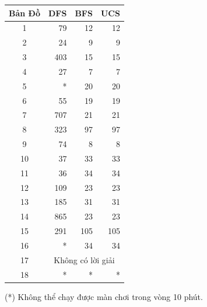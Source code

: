 \documentclass[12pt, letterpaper]{article}
\begin{document}
	\begin{center}
		\begin{tabular}{c r r r}
			\toprule
			\textbf{Bản Đồ} & \textbf{DFS} & \textbf{BFS} & \textbf{UCS} \\
			\midrule
			1  & 79   & 12  & 12   \\
			2  & 24   & 9   & 9    \\
			3  & 403  & 15  & 15   \\
			4  & 27   & 7   & 7    \\
			5  & *    & 20  & 20   \\
			6  & 55   & 19  & 19   \\
			7  & 707  & 21  & 21   \\
			8  & 323  & 97  & 97   \\
			9  & 74   & 8   & 8    \\
			10 & 37   & 33  & 33   \\
			11 & 36   & 34  & 34   \\
			12 & 109  & 23  & 23   \\
			13 & 185  & 31  & 31   \\
			14 & 865  & 23  & 23   \\
			15 & 291  & 105 & 105  \\
			16 & *    & 34  & 34   \\
			17 & \multicolumn{3}{c}{Không có lời giải} \\
			18 & *    & *   & *    \\
			\bottomrule
		\end{tabular}
		
		(*) Không thể chạy được màn chơi trong vòng 10 phút.
		
	\end{center}	
	
\end{document}
